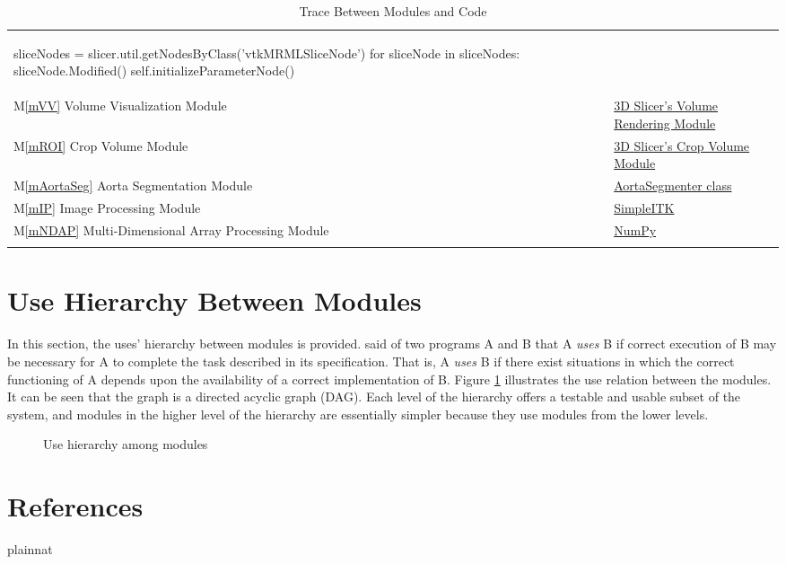 \documentclass[12pt, titlepage]{article}
\newcommand{\mref}[1]{M\ref{#1}}
\begin{document}
\begin{longtable}[H]{p{} p{} p{}}
\begin{python}
        sliceNodes = slicer.util.getNodesByClass('vtkMRMLSliceNode')
        for sliceNode in sliceNodes:
            sliceNode.Modified()
        self.initializeParameterNode()
\end{python}
\\
\multicolumn{2}{p{0.2\textwidth}}{\mref{mVV} Volume Visualization Module} & {\href{https://slicer.readthedocs.io/en/latest/user_guide/modules/volumerendering.html}{3D Slicer's Volume Rendering Module}}\\
\multicolumn{2}{p{0.2\textwidth}}{\mref{mROI} Crop Volume Module} &  {\href{https://slicer.readthedocs.io/en/latest/user_guide/modules/cropvolume.html}{3D Slicer's Crop Volume Module}} \\
\multicolumn{2}{p{0.2\textwidth}}{\mref{mAortaSeg} Aorta Segmentation Module} & \href{https://github.com/smiths/aorta/blob/main/src/SlicerExtension/AortaGeometryReconstructor/AortaGeomReconDisplayModule/AortaGeomReconDisplayModuleLib/AortaSegmenter.py}{AortaSegmenter class}\\
\multicolumn{2}{p{0.2\textwidth}}{\mref{mIP} Image Processing Module} &   \href{https://simpleitk.org/}{SimpleITK} \\
\multicolumn{2}{p{0.2\textwidth}}{\mref{mNDAP} Multi-Dimensional Array Processing Module} & \href{https://numpy.org/}{NumPy}\\
\bottomrule
\caption{Trace Between Modules and Code}
\label{TblTC}
\end{longtable}

\newpage

\section{Use Hierarchy Between Modules} \label{SecUse}

In this section, the uses' hierarchy between modules is
provided. \citet{Parnas1978} said of two programs A and B that A {\em uses} B if
correct execution of B may be necessary for A to complete the task described in
its specification. That is, A {\em uses} B if there exist situations in which
the correct functioning of A depends upon the availability of a correct
implementation of B.  Figure \ref{FigUH} illustrates the use relation between
the modules. It can be seen that the graph is a directed acyclic graph
(DAG). Each level of the hierarchy offers a testable and usable subset of the
system, and modules in the higher level of the hierarchy are essentially simpler
because they use modules from the lower levels.

\begin{figure}[H]
\centering
\caption{Use hierarchy among modules}
\label{FigUH}
\end{figure}

\newpage
\section{References}

 {plainnat}

\end{document}
